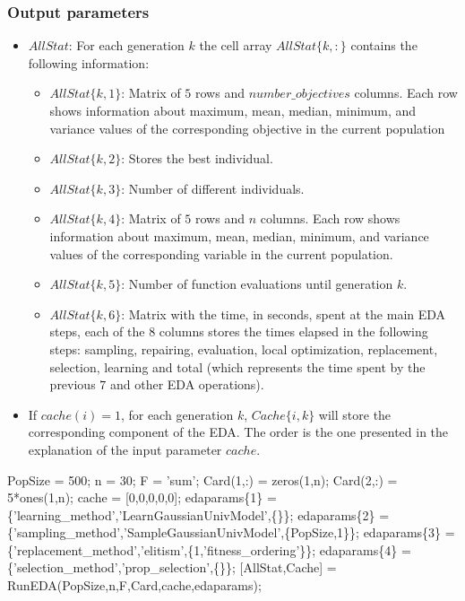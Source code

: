\documentclass[a4paper]{article}
\begin{document}
\subsubsection{Output parameters}


\begin{itemize}
   \item $AllStat$: For each generation $k$ the cell array  $AllStat\{k,:\}$ contains the following information:
 \begin{itemize}
     \item  $AllStat\{k,1\}$:  Matrix of $5$ rows and $number\_objectives$ columns. Each row shows information about
                      maximum, mean, median, minimum, and variance values of the corresponding objective in the current population
     \item  $AllStat\{k,2\}$:  Stores the best individual.
     \item  $AllStat\{k,3\}$:  Number of different individuals.
     \item  $AllStat\{k,4\}$:   Matrix of $5$ rows and $n$  columns. Each row shows information about
                       maximum, mean, median, minimum, and variance values of
                       the corresponding variable in the current
                       population.
\item  $AllStat\{k,5\}$: Number of function evaluations until
generation $k$.
\item   $AllStat\{k,6\}$: Matrix with the time, in seconds, spent at the
main  EDA steps, each of the $8$ columns stores the times elapsed in
the following steps: sampling, repairing, evaluation, local
optimization, replacement, selection, learning and  total (which
represents the time spent by the previous $7$ and other EDA
operations).
\end{itemize}
   \item If $cache(i)=1$,  for each generation $k$,  $Cache\{i,k\}$ will store
    the corresponding component of the EDA. The order is the one  presented in the explanation of the input parameter $cache$.
\end{itemize}


\begin{example}

\begin{programf}
    PopSize = 500;
    n = 30;
    F = 'sum';
    Card(1,:) = zeros(1,n);
    Card(2,:) = 5*ones(1,n);
    cache  = [0,0,0,0,0];
    edaparams\{1\} =  \{'learning\_method','LearnGaussianUnivModel',\{\}\};
    edaparams\{2\} =  \{'sampling\_method','SampleGaussianUnivModel',\{PopSize,1\}\};
    edaparams\{3\} =  \{'replacement\_method','elitism',\{1,'fitness\_ordering'\}\};
    edaparams\{4\} =  \{'selection\_method','prop\_selection',\{\}\};
    [AllStat,Cache] = RunEDA(PopSize,n,F,Card,cache,edaparams);    \end{programf}
\label{ex:EDAPARAMS} \end{example}
\end{document}
